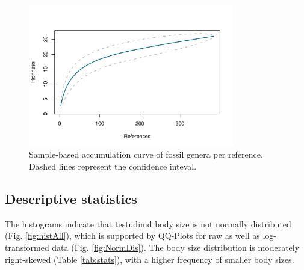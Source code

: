 \begin{figure}[htbp]
	\centering
	\includegraphics[width=0.8\textwidth]{MA_JJ_files/figure-latex/SACGenera-1.pdf}
	\caption[Sample-based accumulation curve on generic level]{Sample-based accumulation curve of fossil genera per reference. Dashed lines represent the confidence inteval.}
	\label{fig:SACGen}
\end{figure}


\FloatBarrier



\subsection{Descriptive statistics}

The histograms indicate that testudinid body size is not normally distributed (Fig. \ref{fig:histAll}), which is supported by QQ-Plots for raw as well as log-transformed data (Fig. \ref{fig:NormDis}).
The body size distribution is moderately right-skewed (Table \ref{tab:stats}), with a higher frequency of smaller body sizes. 

